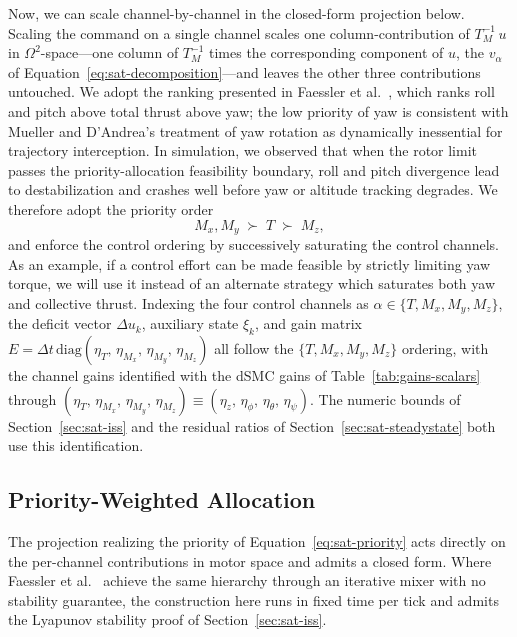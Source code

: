 \documentclass[conf]{new-aiaa}
\begin{document}
Now, we can scale channel-by-channel in the closed-form projection below. Scaling the command on a single channel scales one column-contribution of $T_M^{-1}\,u$ in $\Omega^2$-space---one column of $T_M^{-1}$ times the corresponding component of $u$, the $v_\alpha$ of Equation~\ref{eq:sat-decomposition}---and leaves the other three contributions untouched. We adopt the ranking presented in Faessler et al.\ \cite{refs:Faessler2017}, which ranks roll and pitch above total thrust above yaw; the low priority of yaw is consistent with Mueller and D’Andrea's \cite{refs:Mueller2013} treatment of yaw rotation as dynamically inessential for trajectory interception. In simulation, we observed that when the rotor limit passes the priority-allocation feasibility boundary, roll and pitch divergence lead to destabilization and crashes well before yaw or altitude tracking degrades. We therefore adopt the priority order
\begin{equation}
\label{eq:sat-priority}
M_x, M_y \;\succ\; T \;\succ\; M_z,
\end{equation}
and enforce the control ordering by successively saturating the control channels. As an example, if a control effort can be made feasible by strictly limiting yaw torque, we will use it instead of an alternate strategy which saturates both yaw and collective thrust. Indexing the four control channels as $\alpha \in \{T, M_x, M_y, M_z\}$, the deficit vector $\Delta u_k$, auxiliary state $\xi_k$, and gain matrix $E = \Delta t\,\mathrm{diag}(\eta_T,\, \eta_{M_x},\, \eta_{M_y},\, \eta_{M_z})$ all follow the $\{T, M_x, M_y, M_z\}$ ordering, with the channel gains identified with the dSMC gains of Table~\ref{tab:gains-scalars} through $(\eta_T,\, \eta_{M_x},\, \eta_{M_y},\, \eta_{M_z}) \equiv (\eta_z,\, \eta_\phi,\, \eta_\theta,\, \eta_\psi)$. The numeric bounds of Section~\ref{sec:sat-iss} and the residual ratios of Section~\ref{sec:sat-steadystate} both use this identification.

\subsection{Priority-Weighted Allocation}

The projection realizing the priority of Equation~\ref{eq:sat-priority} acts directly on the per-channel contributions in motor space and admits a closed form. Where Faessler et al.\ \cite{refs:Faessler2017} achieve the same hierarchy through an iterative mixer with no stability guarantee, the construction here runs in fixed time per tick and admits the Lyapunov stability proof of Section~\ref{sec:sat-iss}.
\end{document}

